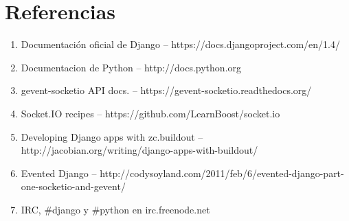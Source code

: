 \documentclass[a4paper,11pt]{article}
\begin{document}
\section{Referencias}
\begin{enumerate}
	\item Documentación oficial de Django -- https://docs.djangoproject.com/en/1.4/
	\item Documentacion de Python -- http://docs.python.org
	\item gevent-socketio API docs. -- https://gevent-socketio.readthedocs.org/
	\item Socket.IO recipes -- https://github.com/LearnBoost/socket.io
	\item Developing Django apps with zc.buildout -- http://jacobian.org/writing/django-apps-with-buildout/
	\item Evented Django -- http://codysoyland.com/2011/feb/6/evented-django-part-one-socketio-and-gevent/
	\item IRC, \#django y \#python en irc.freenode.net
\end{enumerate}
\end{document}
